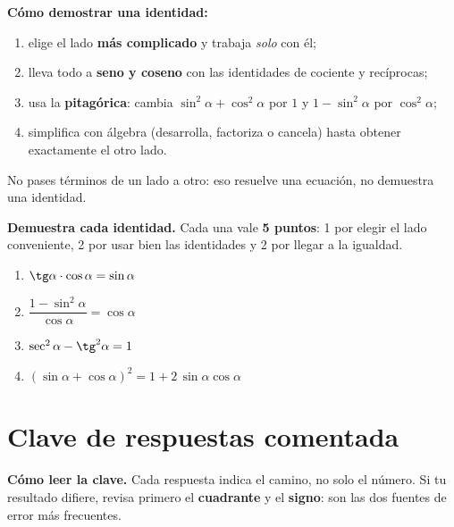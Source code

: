 \documentclass[12pt, letterpaper]{article}
\providecommand{\sen}{\sin}
\begin{document}
\begin{cuadropasos}
  \small
  \textbf{Cómo demostrar una identidad:}
  \begin{enumerate}[leftmargin=1.4em, nosep, topsep=2pt]
    \item elige el lado \textbf{más complicado} y trabaja \emph{solo} con él;
    \item lleva todo a \textbf{seno y coseno} con las identidades de cociente y recíprocas;
    \item usa la \textbf{pitagórica}: cambia $\sen^{2}\alpha+\cos^{2}\alpha$ por $1$
          y $1-\sen^{2}\alpha$ por $\cos^{2}\alpha$;
    \item simplifica con álgebra (desarrolla, factoriza o cancela) hasta obtener
          exactamente el otro lado.
  \end{enumerate}
  No pases términos de un lado a otro: eso resuelve una ecuación, no demuestra
  una identidad.
\end{cuadropasos}

\textbf{Demuestra cada identidad.} Cada una vale \textbf{5 puntos}: 1 por
elegir el lado conveniente, 2 por usar bien las identidades y 2 por llegar a
la igualdad.

\begin{enumerate}[leftmargin=*, label=\textbf{\alph*)}, itemsep=3.2em]
  \item $\tg\alpha\cdot\cos\alpha=\sen\alpha$

  \item $\dfrac{1-\sen^{2}\alpha}{\cos\alpha}=\cos\alpha$

  \item $\sec^{2}\alpha-\tg^{2}\alpha=1$

  \item $\left(\sen\alpha+\cos\alpha\right)^{2}=1+2\,\sen\alpha\cos\alpha$
\end{enumerate}

\ifmwclaves
\clearpage
\section*{Clave de respuestas comentada}

\begin{cuadroinfo}
  \small
  \textbf{Cómo leer la clave.} Cada respuesta indica el camino, no solo el
  número. Si tu resultado difiere, revisa primero el \textbf{cuadrante} y el
  \textbf{signo}: son las dos fuentes de error más frecuentes.
\end{cuadroinfo}
\end{document}
